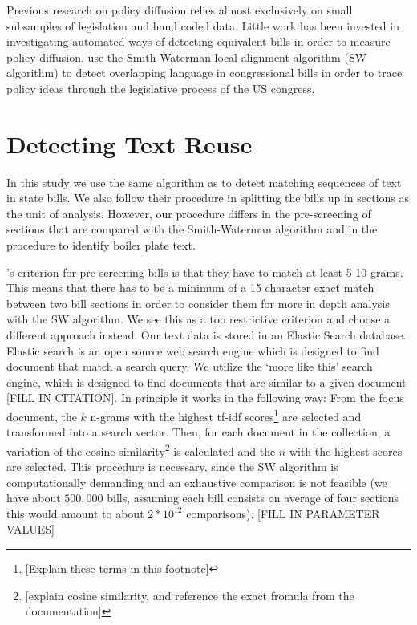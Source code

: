 \documentclass[12pt]{article} %
\begin{document}
Previous research on policy diffusion relies almost exclusively on small subsamples of legislation and hand coded data. Little work has been invested in investigating automated ways of detecting equivalent bills in order to measure policy diffusion. 
\citet{wilkerson2015tracing} use the Smith-Waterman local alignment algorithm (SW algorithm) \citep{smith1981identification} to detect overlapping language in congressional bills in order to trace policy ideas through the legislative process of the US congress. 



\section{Detecting Text Reuse}

In this study we use the same algorithm as \citet{wilkerson2015tracing} to detect matching sequences of text in state bills. We also follow their procedure in splitting the bills up in sections as the unit of analysis. However, our procedure differs in the pre-screening of sections that are compared with the Smith-Waterman algorithm and in the procedure to identify boiler plate text.

\citet{wilkerson2015tracing}'s criterion for pre-screening bills is that they have to match at least 5 10-grams. This means that there has to be a minimum of a 15 character exact match between two bill sections in order to consider them for more in depth analysis with the SW algorithm. We see this as a too restrictive criterion and choose a different approach instead. Our text data is stored in an Elastic Search database. Elastic search is an open source web search engine which is designed to find document that match a search query. We utilize the `more like this' search engine, which is designed to find documents that are similar to a given document [FILL IN CITATION]. In principle it works in the following way: From the focus document, the $k$ n-grams with the highest tf-idf scores\footnote{[Explain these terms in this footnote]} are selected and transformed into a search vector. Then, for each document in the collection, a variation of the cosine similarity\footnote{[explain cosine similarity, and reference the exact fromula from the documentation]} is calculated and the $n$ with the highest scores are selected. This procedure is necessary, since the SW algorithm is computationally demanding and an exhaustive comparison is not feasible (we have about $500,000$ bills, assuming each bill consists on average of four sections this would amount to about $2 * 10^{12}$ comparisons). [FILL IN PARAMETER VALUES]
\end{document}
